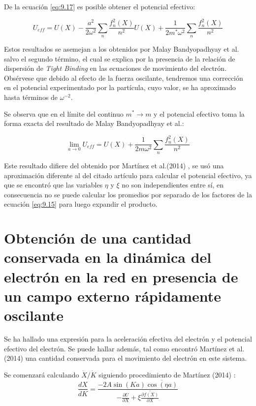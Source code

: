 De la ecuación \ref{eq:9.17} es posible obtener el potencial efectivo:

\begin{equation}\label{eq:9.18}
    U_{eff}= U(X)-\frac{a^2}{2\omega^2}\sum_n \frac{f_n^2(X)}{n^2}U(X)+\frac{1}{2m^{*}\omega^2}\sum_n \frac{f_n^2(X)}{n^2} 
\end{equation}

Estos resultados se asemejan a los obtenidos por Malay Bandyopadhyay et al. \cite{datta} salvo el segundo término, el cual se explica por la presencia de la relación de dispersión de \textit{Tight Binding} en las ecuaciones de movimiento del electrón. Obsérvese que debido al efecto de la fuerza oscilante, tendremos una corrección en el potencial experimentado por la partícula, cuyo valor, se ha aproximado hasta términos de $\omega^{-2}$.

Se observa que en el límite del continuo $m^* \rightarrow m$ y el potencial efectivo toma la forma exacta del resultado de Malay Bandyopadhyay et al.: 

\begin{equation}\label{eq:9.19}
    \lim_{a\rightarrow 0}U_{eff}= U(X)+\frac{1}{2m\omega^2}\sum_n \frac{f_n^2(X)}{n^2} 
\end{equation}

Este resultado difiere del obtenido por Martínez et al.(2014) \cite{mart2014}, se usó una aproximación diferente al del citado artículo para calcular el potencial efectivo, ya que se encontró que las variables $\eta$ y $\xi$ no son independientes entre sí, en consecuencia no se puede calcular los promedios por separado de los factores de la ecuación \ref{eq:9.15} para luego expandir el producto. 

\section{Obtención de una cantidad conservada en la dinámica del electrón en la red en presencia de un campo externo rápidamente oscilante}\label{cap:9.2}

Se ha hallado una expresión para la aceleración efectiva del electrón y el potencial efectivo del electrón. Se puede hallar además, tal como encontró Martínez et al. (2014) una cantidad conservada para el movimiento del electrón en este sistema.

Se comenzará calculando $\dot{X}/\dot{K}$ siguiendo procedimiento de Martínez (2014) \cite{mart2014}: 
\begin{equation}\label{eq:9.20}
    \frac{dX}{dK}=\frac{-2A\sin(Ka)\overline{\cos(\eta a)}}{-\frac{\partial U}{\partial X}+\xi \overline{\frac{\partial f(X)}{\partial X}}}
\end{equation}

